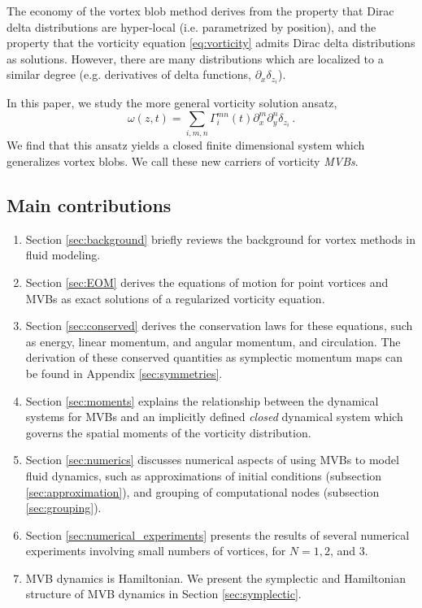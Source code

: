 \documentclass[12pt]{amsart}
\theoremstyle{remark}
\begin{document}
The economy of the vortex blob method derives from the property that Dirac delta distributions are hyper-local (i.e. parametrized by position), and the property that the vorticity equation  \eqref{eq:vorticity} admits Dirac delta distributions as solutions.
However, there are many distributions which are localized to a similar degree (e.g. derivatives of delta functions, $\partial_x \delta_{z_i}$).

In this paper, we study the more general vorticity solution ansatz,
\[\omega(z,t) = \sum_{i,m,n} \Gamma_i^{mn}(t) \partial_x^m \partial_y^n \delta_{z_i}\,.\]
We find that this ansatz yields a closed finite dimensional system which generalizes vortex blobs. We call these new carriers of vorticity \emph{MVBs}.

\subsection{Main contributions}
\begin{enumerate}
        \item Section \ref{sec:background} briefly reviews the background for vortex methods in fluid modeling.
        \item Section \ref{sec:EOM} derives the equations of motion for point vortices and MVBs as exact solutions of a regularized vorticity equation.
        \item Section \ref{sec:conserved} derives the conservation laws for these equations, such as energy, linear momentum, and angular momentum, and circulation.
        The derivation of these conserved quantities as symplectic momentum maps can be found in Appendix \ref{sec:symmetries}.
        \item Section \ref{sec:moments} explains the relationship between the dynamical systems for MVBs and an implicitly defined \emph{closed} dynamical system which governs the spatial moments of the vorticity distribution.
        \item Section \ref{sec:numerics} discusses numerical aspects of using MVBs to model fluid dynamics, such as approximations of initial conditions (subsection \ref{sec:approximation}), and grouping of computational nodes (subsection \ref{sec:grouping}).
        \item  Section \ref{sec:numerical_experiments} presents the results of several numerical experiments involving small numbers of vortices, for $N=1,2$, and $3$.
        	\item MVB dynamics is Hamiltonian. We present the symplectic and Hamiltonian structure of MVB dynamics in Section \ref{sec:symplectic}.
\end{enumerate}
\end{document}
